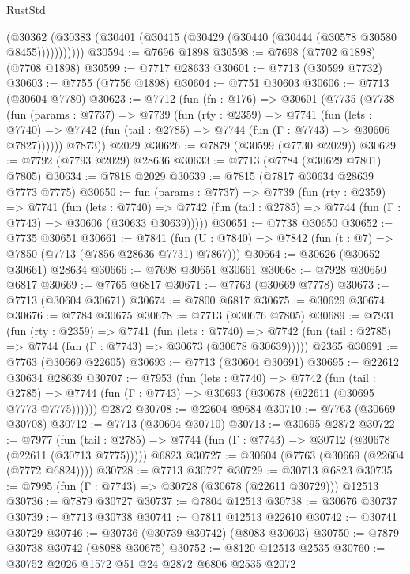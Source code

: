 \begin{lexlean}{RustStd}
\begin{coremodule}
          (@30362 (@30383 (@30401 (@30415 (@30429 (@30440 (@30444 (@30578 @30580 @8455)))))))))))
@30594 := @7696 @1898
@30598 := @7698 (@7702 @1898) (@7708 @1898)
@30599 := @7717 @28633
@30601 := @7713 (@30599 @7732)
@30603 := @7755 (@7756 @1898)
@30604 := @7751 @30603
@30606 := @7713 (@30604 @7780)
@30623 := @7712
    (fun (fn : @176) =>
    @30601
      (@7735
        (@7738
          (fun (params : @7737) =>
          @7739
            (fun (rty : @2359) =>
            @7741
              (fun (lets : @7740) =>
              @7742 (fun (tail : @2785) => @7744 (fun (Γ : @7743) => @30606 @7827))))))
        @7873))
    @2029
@30626 := @7879 (@30599 (@7730 @2029))
@30629 := @7792 (@7793 @2029) @28636
@30633 := @7713 (@7784 (@30629 @7801) @7805)
@30634 := @7818 @2029
@30639 := @7815 (@7817 @30634 @28639 @7773 @7775)
@30650 := fun (params : @7737) =>
  @7739
    (fun (rty : @2359) =>
    @7741
      (fun (lets : @7740) =>
      @7742 (fun (tail : @2785) => @7744 (fun (Γ : @7743) => @30606 (@30633 @30639)))))
@30651 := @7738 @30650
@30652 := @7735 @30651
@30661 := @7841
    (fun (U : @7840) => @7842 (fun (t : @7) => @7850 (@7713 (@7856 @28636 @7731) @7867)))
@30664 := @30626 (@30652 @30661) @28634
@30666 := @7698 @30651 @30661
@30668 := @7928 @30650 @6817
@30669 := @7765 @6817
@30671 := @7763 (@30669 @7778)
@30673 := @7713 (@30604 @30671)
@30674 := @7800 @6817
@30675 := @30629 @30674
@30676 := @7784 @30675
@30678 := @7713 (@30676 @7805)
@30689 := @7931
    (fun (rty : @2359) =>
    @7741
      (fun (lets : @7740) =>
      @7742 (fun (tail : @2785) => @7744 (fun (Γ : @7743) => @30673 (@30678 @30639)))))
    @2365
@30691 := @7763 (@30669 @22605)
@30693 := @7713 (@30604 @30691)
@30695 := @22612 @30634 @28639
@30707 := @7953
    (fun (lets : @7740) =>
    @7742
      (fun (tail : @2785) =>
      @7744 (fun (Γ : @7743) => @30693 (@30678 (@22611 (@30695 @7773 @7775))))))
    @2872
@30708 := @22604 @9684
@30710 := @7763 (@30669 @30708)
@30712 := @7713 (@30604 @30710)
@30713 := @30695 @2872
@30722 := @7977
    (fun (tail : @2785) => @7744 (fun (Γ : @7743) => @30712 (@30678 (@22611 (@30713 @7775)))))
    @6823
@30727 := @30604 (@7763 (@30669 (@22604 (@7772 @6824))))
@30728 := @7713 @30727
@30729 := @30713 @6823
@30735 := @7995 (fun (Γ : @7743) => @30728 (@30678 (@22611 @30729))) @12513
@30736 := @7879 @30727
@30737 := @7804 @12513
@30738 := @30676 @30737
@30739 := @7713 @30738
@30741 := @7811 @12513 @22610
@30742 := @30741 @30729
@30746 := @30736 (@30739 @30742) (@8083 @30603)
@30750 := @7879 @30738 @30742 (@8088 @30675)
@30752 := @8120 @12513 @2535
@30760 := @30752 @2026 @1572 @51 @24 @2872 @6806 @2535 @2072

\end{coremodule}
\end{lexlean}

